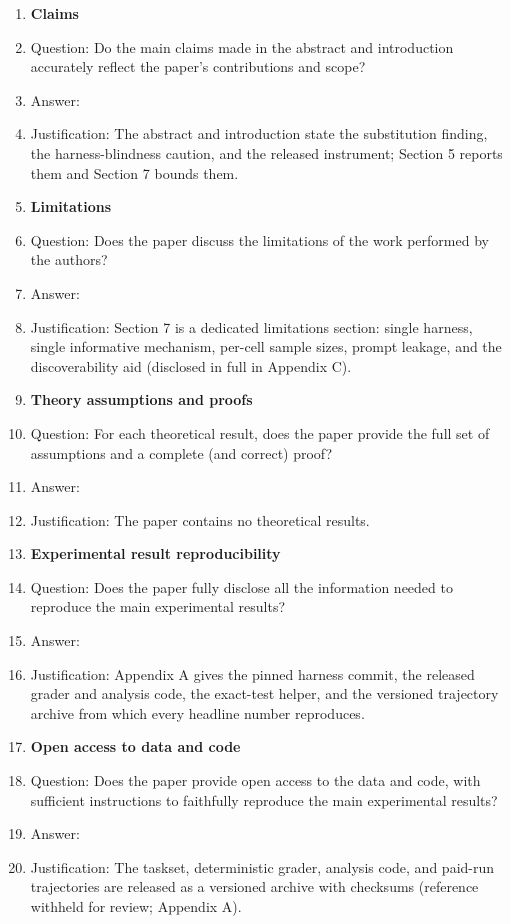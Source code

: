 \documentclass{article}
\begin{document}
\begin{enumerate}

\item {\bf Claims}
    \item[] Question: Do the main claims made in the abstract and introduction accurately reflect the paper's contributions and scope?
    \item[] Answer: \answerYes{}
    \item[] Justification: The abstract and introduction state the substitution finding, the harness-blindness caution, and the released instrument; Section 5 reports them and Section 7 bounds them.

\item {\bf Limitations}
    \item[] Question: Does the paper discuss the limitations of the work performed by the authors?
    \item[] Answer: \answerYes{}
    \item[] Justification: Section 7 is a dedicated limitations section: single harness, single informative mechanism, per-cell sample sizes, prompt leakage, and the discoverability aid (disclosed in full in Appendix C).

\item {\bf Theory assumptions and proofs}
    \item[] Question: For each theoretical result, does the paper provide the full set of assumptions and a complete (and correct) proof?
    \item[] Answer: \answerNA{}
    \item[] Justification: The paper contains no theoretical results.

\item {\bf Experimental result reproducibility}
    \item[] Question: Does the paper fully disclose all the information needed to reproduce the main experimental results?
    \item[] Answer: \answerYes{}
    \item[] Justification: Appendix A gives the pinned harness commit, the released grader and analysis code, the exact-test helper, and the versioned trajectory archive from which every headline number reproduces.

\item {\bf Open access to data and code}
    \item[] Question: Does the paper provide open access to the data and code, with sufficient instructions to faithfully reproduce the main experimental results?
    \item[] Answer: \answerYes{}
    \item[] Justification: The taskset, deterministic grader, analysis code, and paid-run trajectories are released as a versioned archive with checksums (reference withheld for review; Appendix A).


\end{enumerate}
\end{document}
